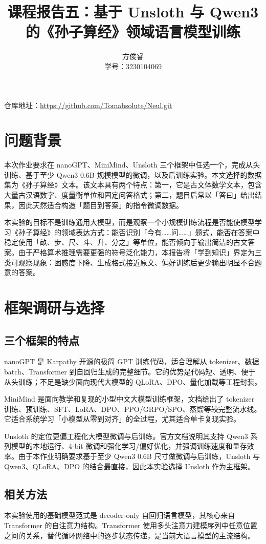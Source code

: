 \documentclass[a4paper,10pt,twocolumn]{article}
\title{课程报告五：基于 Unsloth 与 Qwen3 的《孙子算经》领域语言模型训练}
\author{方俊睿\\学号：3230104069}
\date{}
\begin{document}
\maketitle

\noindent 仓库地址：\url{https://github.com/Tomabsolute/Neul.git}

\section{问题背景}
本次作业要求在 nanoGPT、MiniMind、Unsloth 三个框架中任选一个，完成从头训练、基于至少 Qwen3 0.6B 规模模型的微调，以及后训练实验。本文选择的数据集为《孙子算经》文本。该文本具有两个特点：第一，它是古文体数学文本，包含大量古汉语数字、度量衡单位和固定问答格式；第二，题目后常以「答曰」给出结果，因此天然适合构造「题目到答案」的指令微调数据。

本实验的目标不是训练通用大模型，而是观察一个小规模训练流程是否能使模型学习《孙子算经》的领域表达方式：能否识别「今有……问……」题式，能否在答案中稳定使用「畝、步、尺、斗、升、分之」等单位，能否倾向于输出简洁的古文答案。由于严格算术推理需要更强的符号泛化能力，本报告将「学到知识」界定为三类可观察现象：困惑度下降、生成格式接近原文、偏好训练后更少输出明显不合题意的答案。

\section{框架调研与选择}
\subsection{三个框架的特点}
nanoGPT 是 Karpathy 开源的极简 GPT 训练代码，适合理解从 tokenizer、数据 batch、Transformer 到自回归生成的完整细节。它的优势是代码短、透明、便于从头训练；不足是缺少面向现代大模型的 QLoRA、DPO、量化加载等工程封装。

MiniMind 是面向教学和复现的小型中文大模型训练框架，文档给出了 tokenizer 训练、预训练、SFT、LoRA、DPO、PPO/GRPO/SPO、蒸馏等较完整流水线。它适合系统学习「小模型从零到对齐」的全过程，尤其适合单卡复现实验。

Unsloth 的定位更偏工程化大模型微调与后训练。官方文档说明其支持 Qwen3 系列模型的本地运行、4-bit 微调和强化学习/偏好优化，并强调训练速度和显存效率。由于本作业明确要求基于至少 Qwen3 0.6B 尺寸做微调与后训练，Unsloth 与 Qwen3、QLoRA、DPO 的结合最直接，因此本实验选择 Unsloth 作为主框架。

\subsection{相关方法}
本实验使用的基础模型范式是 decoder-only 自回归语言模型，其核心来自 Transformer 的自注意力结构。Transformer 使用多头注意力建模序列中任意位置之间的关系，替代循环网络中的逐步状态传递，是当前大语言模型的主流结构。
\end{document}
